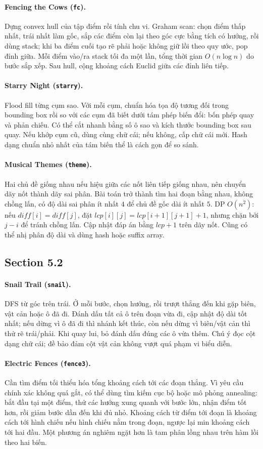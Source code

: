 \documentclass[11pt]{article}
\newcommand{\problem}[2]{\paragraph{#1 (\texttt{#2}).}}
\newcommand{\bigO}[1]{\ensuremath{O(#1)}}
\begin{document}
\problem{Fencing the Cows}{fc}
Dựng convex hull của tập điểm rồi tính chu vi. Graham scan: chọn điểm thấp nhất, trái nhất làm gốc, sắp các điểm còn lại theo góc cực bằng tích có hướng, rồi dùng stack; khi ba điểm cuối tạo rẽ phải hoặc không giữ lồi theo quy ước, pop đỉnh giữa. Mỗi điểm vào/ra stack tối đa một lần, tổng thời gian \(\bigO{n\log n}\) do bước sắp xếp. Sau hull, cộng khoảng cách Euclid giữa các đỉnh liên tiếp.

\problem{Starry Night}{starry}
Flood fill từng cụm sao. Với mỗi cụm, chuẩn hóa tọa độ tương đối trong bounding box rồi so với các cụm đã biết dưới tám phép biến đổi: bốn phép quay và phản chiếu. Có thể cắt nhanh bằng số ô sao và kích thước bounding box sau quay. Nếu khớp cụm cũ, dùng cùng chữ cái; nếu không, cấp chữ cái mới. Hash dạng chuẩn nhỏ nhất của tám biến thể là cách gọn để so sánh.

\problem{Musical Themes}{theme}
Hai chủ đề giống nhau nếu hiệu giữa các nốt liên tiếp giống nhau, nên chuyển dãy nốt thành dãy sai phân. Bài toán trở thành tìm hai đoạn bằng nhau, không chồng lấn, có độ dài sai phân ít nhất \(4\) để chủ đề gốc dài ít nhất \(5\). DP \(\bigO{n^2}\): nếu \(diff[i]=diff[j]\), đặt \(lcp[i][j]=lcp[i+1][j+1]+1\), nhưng chặn bởi \(j-i\) để tránh chồng lấn. Cập nhật đáp án bằng \(lcp+1\) trên dãy nốt. Cũng có thể nhị phân độ dài và dùng hash hoặc suffix array.

\subsection*{Section 5.2}

\problem{Snail Trail}{snail}
DFS từ góc trên trái. Ở mỗi bước, chọn hướng, rồi trượt thẳng đến khi gặp biên, vật cản hoặc ô đã đi. Đánh dấu tất cả ô trên đoạn vừa đi, cập nhật độ dài tốt nhất; nếu dừng vì ô đã đi thì nhánh kết thúc, còn nếu dừng vì biên/vật cản thì thử rẽ trái/phải. Khi quay lui, bỏ đánh dấu đúng các ô vừa thêm. Chú ý đọc cột dạng chữ cái; đề bảo đảm cột vật cản không vượt quá phạm vi biểu diễn.

\problem{Electric Fences}{fence3}
Cần tìm điểm tối thiểu hóa tổng khoảng cách tới các đoạn thẳng. Vì yêu cầu chính xác không quá gắt, có thể dùng tìm kiếm cục bộ hoặc mô phỏng annealing: bắt đầu tại một điểm, thử các hướng xung quanh với bước lớn, nhận điểm tốt hơn, rồi giảm bước dần đến khi đủ nhỏ. Khoảng cách từ điểm tới đoạn là khoảng cách tới hình chiếu nếu hình chiếu nằm trong đoạn, ngược lại min khoảng cách tới hai đầu. Một phương án nghiêm ngặt hơn là tam phân lồng nhau trên hàm lồi theo hai biến.
\end{document}
